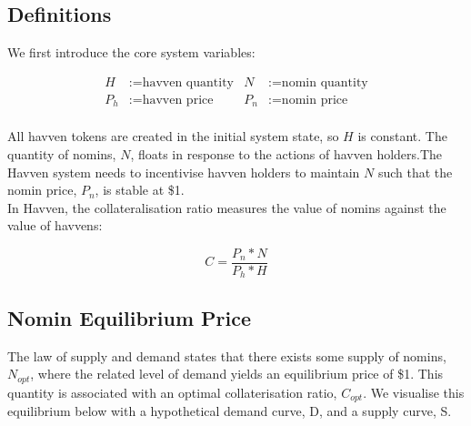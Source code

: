 \newpage

\subsection{Definitions}

\noindent We first introduce the core system variables:

\begin{align*}
H &:= \text{havven quantity} & N &:= \text{nomin quantity} \\
P_h &:= \text{havven price}  & P_n &:= \text{nomin price} \\
\end{align*}


\noindent All havven tokens are created in the initial system state, so $H$ is constant. The quantity of nomins, $N$, floats in response to the actions of havven holders.The Havven system needs to incentivise havven holders to maintain $N$ such that the nomin price, $P_n$, is stable at \$1.\\

\noindent In Havven, the collateralisation ratio measures the value of nomins against the value of havvens:

\begin{equation}
C = \frac{P_n * N}{P_h * H} \label{eq:1}
\end{equation}

\subsection{Nomin Equilibrium Price} The law of supply and demand states that there exists some supply of nomins, $N_{opt}$, where the related level of demand yields an equilibrium price of \$1. This quantity is associated with an optimal collaterisation ratio, $C_{opt}$. We visualise this equilibrium below with a hypothetical demand curve, D, and a supply curve, S.  \\

\begin{center}
\end{center}

